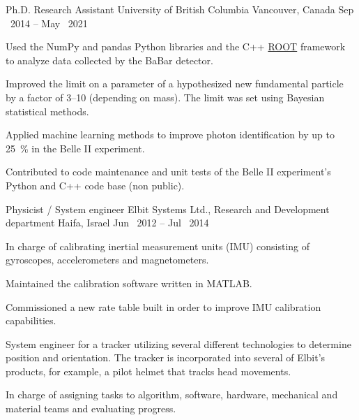 

\begin{cventries}

    \cventryWithTags
    {Ph.D. Research Assistant} %
    {University of British Columbia} %
    {Vancouver, Canada} %
    {Sep \ 2014 -- May \ 2021} %
    {         \fbox{\LaTeX}} %
    {
      \begin{cvitems} %
      \item {Used the NumPy and pandas Python libraries and the C++ \hypersetup{urlcolor=blue}\href{https://root.cern.ch/}{ROOT} framework to analyze data collected by the BaBar detector.}
      \item {Improved the limit on a parameter of a hypothesized new fundamental particle by a factor of 3--10 (depending on mass). The limit was set using Bayesian statistical methods.}
        \item {Applied machine learning methods to improve photon identification by up to \SI{25}{\percent} in the Belle II experiment.}
        \item {Contributed to code maintenance and unit tests of the Belle II experiment's Python and C++ code base (non public).}
      \end{cvitems}
    }

    \cventryWithTags
    {Physicist / System engineer} %
    {Elbit Systems Ltd., Research and Development department} %
    {Haifa, Israel} %
    {Jun \ 2012 -- Jul \ 2014} %
    {  }
    {
      \begin{cvitems} %
        \item {In charge of calibrating inertial measurement units (IMU) consisting of gyroscopes, accelerometers and magnetometers.}
        \item {Maintained the calibration software written in MATLAB.}
        \item {Commissioned a new rate table built in order to improve IMU calibration capabilities.}
        \item {System engineer for a tracker utilizing several different
          technologies to determine position and orientation. The tracker is incorporated into several of Elbit's products, for example, a pilot helmet that tracks head movements.}
        \item {In charge of assigning tasks to algorithm, software, hardware, mechanical and material teams and evaluating progress.}
      \end{cvitems}
    }


\end{cventries}
